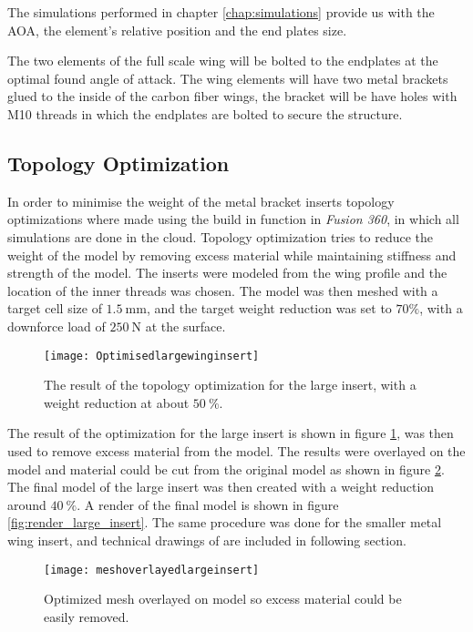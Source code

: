   The simulations performed in chapter \ref{chap:simulations} provide us with the AOA, the element's relative position and the end plates size.

  The two elements of the full scale wing will be bolted to the endplates at the optimal found angle of attack. The wing elements will have two metal brackets glued to the inside of the carbon fiber wings, the bracket will be have holes with M10 threads in which the endplates are bolted to secure the structure.

  \subsection{Topology Optimization}

  In order to minimise the weight of the metal bracket inserts topology optimizations where made using the build in function in \emph{Fusion 360}, in which all simulations are done in the cloud. Topology optimization tries to reduce the weight of the model by removing excess material while maintaining stiffness and strength of the model.
  The inserts were modeled from the wing profile and the location of the inner threads was chosen. The model was then meshed with a target cell size of $\SI{1.5}{\milli\metre}$, and the target weight reduction was set to $70\%$, with a downforce load of $\SI{250}{\newton}$ at the surface.

  \begin{figure}
    \texttt{[image: Optimisedlargewinginsert]}
    \caption{The result of the topology optimization for the large insert, with a weight reduction at about $\SI{50}{\%}$.}
    \label{fig:topology_large_insert}
  \end{figure}

  The result of the optimization for the large insert is shown in figure \ref{fig:topology_large_insert}, was then used to remove excess material from the model. The results were overlayed on the model and material could be cut from the original model as shown in figure
  \ref{fig:meshoverlay}. The final model of the large insert was then created with a weight reduction around $\SI{40}{\%}$. A render of the final model is shown in
  figure \ref{fig:render_large_insert}. The same procedure was done for the smaller metal wing insert, and technical drawings of are included in following section.


  \begin{figure}
    \texttt{[image: meshoverlayedlargeinsert]}
    \caption{Optimized mesh overlayed on model so excess material could be easily removed.}
    \label{fig:meshoverlay}
  \end{figure}

